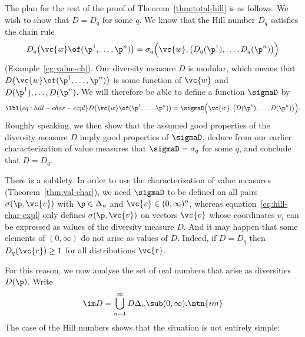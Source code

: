 The plan for the rest of the proof of Theorem~\ref{thm:total-hill} is as
follows.  We wish to show that $D = D_q$ for some $q$.  We know that the
Hill number $D_q$ satisfies the chain rule
\[
D_q\bigl( \vc{w} \of (\p^1, \ldots, \p^n) \bigr)
=
\sigma_q \Bigl( \vc{w}, \bigl( D_q(\p^1), \ldots, D_q(\p^n) \bigr) \Bigr)
\]
(Example~\ref{eg:value-ch}).  Our diversity measure $D$ is modular, which
means that $D\bigl( \vc{w} \of (\p^1, \ldots, \p^n) \bigr)$ is some
function of $\vc{w}$ and $D(\p^1), \ldots, D(\p^n)$.  We will therefore be
able to define a function $\sigmaD$ by
% 
\begin{equation}
\lbl{eq:hill-char-expl}
D\bigl(\vc{w} \of (\p^1, \ldots, \p^n)\bigr)
=
\sigmaD \Bigl( \vc{w}, \bigl( D(\p^1), \ldots, D(\p^n) \bigr) \Bigr).
\end{equation}
% 
Roughly speaking, we then show that the assumed good properties of the
diversity measure $D$ imply good properties of $\sigmaD$, deduce from our
earlier characterization of value measures that $\sigmaD = \sigma_q$ for
some $q$, and conclude that $D = D_q$.

There is a subtlety.  In order to use the characterization of value
measures (Theorem~\ref{thm:val-char}), we need $\sigmaD$ to be defined on
all pairs $\sigma(\p, \vc{v})$ with $\p \in \Delta_n$ and $\vc{v} \in (0,
\infty)^n$, whereas equation~\eqref{eq:hill-char-expl} only defines
$\sigma(\p, \vc{v})$ on vectors $\vc{v}$ whose coordinates $v_i$ can be
expressed as values of the diversity measure $D$.  And it may happen that
some elements of $(0, \infty)$ do not arise as values of $D$.  Indeed, if
$D = D_q$ then $D_q(\vc{r}) \geq 1$ for all distributions $\vc{r}$.

For this reason, we now analyse the set of real numbers that arise as
diversities $D(\p)$.  Write
\[
\index{image of diversity measure}
\index{diversity measure!image of}
\im D 
=
\bigcup_{n = 1}^\infty D\Delta_n 
\sub 
(0, \infty).
\ntn{im}
\]
The case of the Hill numbers shows that the situation is not
entirely simple:

